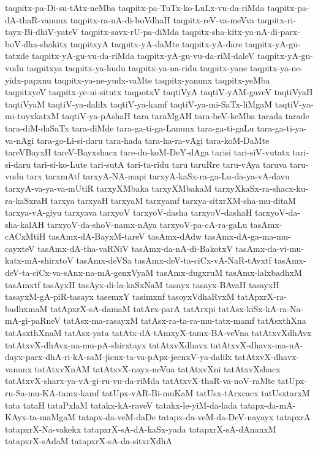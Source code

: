 {taqpitx-pa-Di-su-tAtx-neMba
taqpitx-pa-TuTx-ko-LuLx-vu-da-riMda
taqpitx-pa-dA-thaR-vanunx
taqpitx-ra-nA-di-boVdhaH
taqpitx-reV-va-meVva
taqpitx-ri-tayx-Bi-dhiV-yateV
taqpitx-savx-rU-pa-diMda
taqpitx-sha-kitx-ya-nA-di-parx-boV-dha-shakitx
taqpitxyA
taqpitx-yA-daMte
taqpitx-yA-dare
taqpitx-yA-gu-tatxde
taqpitx-yA-gu-vu-da-riMda
taqpitx-yA-gu-vu-da-riM-daleV
taqpitx-yA-gu-vudu
taqpitxya
taqpitx-ya-hudu
taqpitx-ya-na-ridu
taqpitx-yane
taqpitx-ya-ne-yidx-papxnu
taqpitx-ya-ne-yudx-vaMte
taqpitx-yanunx
taqpitx-yeMba
taqpitxyeV
taqpitx-ye-ni-situtx
taqpotxV
taqtiVyA
taqtiV-yAM-gaveV
taqtiVyaH
taqtiVyaM
taqtiV-ya-dalilx
taqtiV-ya-kamf
taqtiV-ya-mi-SaTx-liMgaM
taqtiV-ya-mi-tuyxkatxM
taqtiV-ya-pAshaH
tara
taraMgAH
tara-beV-keMba
tarada
tarade
tara-diM-daSaTx
tara-diMde
tara-ga-ti-ga-Lanunx
tara-ga-ti-gaLu
tara-ga-ti-ya-va-nAgi
tara-go-Li-si-daru
tara-hada
tara-ha-ra-vAgi
tara-koM-DaMte
tareVBayxH
tareV-Bayxshacx
tare-du-koM-DeY-dAga
tarisi
tari-siV-vutatx
tari-si-daru
tari-si-ko-Lute
tari-sutA
tari-ta-ridu
taru
taruRre
taru-vAya
taruva
taru-vudu
tarx
tarxmAtf
tarxyA-NA-mapi
tarxyA-kaSx-ra-ga-Lu-da-ya-vA-davu
tarxyA-va-ya-va-mUtiR
tarxyXMbaka
tarxyXMbakaM
tarxyXkaSx-ra-shacx-ku-ra-kaSxraH
tarxya
tarxyaH
tarxyaM
tarxyamf
tarxya-sitxrXM-sha-mu-ditaM
tarxya-vA-giyu
tarxyava
tarxyoV
tarxyoV-dasha
tarxyoV-dashaH
tarxyoV-da-sha-kalAH
tarxyoV-da-shoV-namx-nAya
tarxyoV-pa-cA-ra-gaLu
tasAmx-cACxMtiH
tasAmx-dA-BayxM-tareV
tasAmx-dAdw
tasAmx-dA-ga-ma-mu-cayxteV
tasAmx-dA-tha-vaRNiV
tasAmx-da-nA-di-BakotxV
tasAmx-da-vi-mu-katx-mA-shirxtoV
tasAmx-deVSa
tasAmx-deV-ta-ciCx-vA-NaR-tAvxtf
tasAmx-deV-ta-ciCx-va-sAnx-na-mA-genxVyaM
tasAmx-dugxruM
tasAmx-lalxbadhxM
tasAmxtf
tasAyxH
tasAyx-di-la-kaSxNaM
tasayx
tasayx-BAvaH
tasayxH
tasayxM-gA-piR-tasayx
tasemxY
tasimxnf
tasoyxVdhaRvxM
tatApxrX-ra-badhxmaM
tatApxrX-sA-damaM
tatArx-parA
tatArxpi
tatAsx-kiSx-kA-ra-Na-mA-gi-paRneV
tatAsx-ma-rasayxM
tatAsx-ra-ta-ra-mu-tatx-mamf
tatAsxthXna
tatAsxthXnaM
tatAsx-yata
tatAtx-dA-tAmxyX-tamx-BA-veVna
tatAtxvXdhAvx
tatAtxvX-dhAvx-na-mu-pA-shirxtayx
tatAtxvXdhavx
tatAtxvX-dhavx-ma-nA-dayx-parx-dhA-ri-kA-saM-jicnx-ta-va-pApx-jecnxV-ya-dalilx
tatAtxvX-dhavx-vanunx
tatAtxvXnAM
tatAtxvX-nayx-neVna
tatAtxvXni
tatAtxvXshacx
tatAtxvX-sharx-ya-vA-gi-ru-vu-da-riMda
tatAtxvX-thaR-va-noV-raMte
tatUpx-ru-Sa-mu-KA-tamx-kamf
tatUpx-vAR-Bi-muKaM
tatUsx-tArxcacx
tatUsxtarxM
tata
tataH
tataPxlaM
tatakx-kA-raveV
tatakx-le-yiM-da-lada
tatapx-da-mA-KAyx-ta-maMgaM
tatapx-da-veM-daDe
tatapx-da-veM-da-DeV-nayayx
tatapxrA
tatapxrX-Na-vakekx
tatapxrX-sA-dA-kaSx-yada
tatapxrX-sA-dAnanxM
tatapxrX-sAdaM
tatapxrX-sA-da-sitxrXdhA
}
